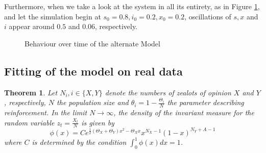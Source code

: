 \documentclass[12pt,a4paper,twoside]{article}
\newtheorem{thm}{Theorem}[section]
\begin{document}
\newpage

Furthermore, when we take a look at the system in all its entirety, as in Figure \ref{fig:time_behaviour_my_model}, and let the simulation begin at $s_0 = 0.8, i_0 = 0.2, x_0 = 0.2$, oscillations of $s, x$ and $i$ appear around $0.5$ and $0.06$, respectively.

\begin{figure}[h!]
	\centering
	\caption{Behaviour over time of the alternate Model}
	\label{fig:time_behaviour_my_model}
	\def\svgwidth{350pt}
	
\end{figure}


\newpage

\subsection{Fitting of the model on real data}

\begin{thm}\label{theorem:weak_eff_lim}
	Let $N_i, i \in \lbrace X,Y\rbrace$ denote the numbers of zealots of opinion $X$ and $Y$, respectively, $N$ the population size and $\theta_i = 1-\frac{\Theta_i}{N}$ the parameter describing reinforcement. In the limit $N \rightarrow \infty$, the density of the invariant measure for the random variable $z_t = \frac{X_t}{N}$ is given by
	\begin{equation}
		\phi(x) = Ce^{\frac{1}{2}\left(\Theta_X + \Theta_Y\right)x^2 - \Theta_X x}x^{N_X - 1}\left(1-x\right)^{N_Y+A - 1}
	\end{equation}
	where $C$ is determined by the condition $\int_{0}^{1}\phi(x) dx = 1$.
\end{thm}
\end{document}
